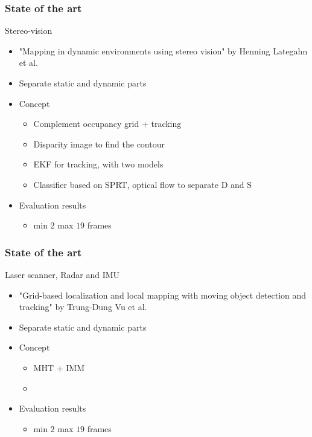 \documentclass{beamer}
\begin{document}
	\begin{frame}
		\frametitle{State of the art}	
		\begin{block}{Stereo-vision}
			\begin{itemize}
			\item "Mapping in dynamic environments using stereo vision" by Henning Lategahn et al.
			\item Separate static and dynamic parts
			\item Concept
				\begin{itemize}			
				\item Complement occupancy grid + tracking
				\item Disparity image to find the contour
				\item EKF for tracking, with two models
				\item Classifier based on SPRT, optical flow to separate D and S				
				\end{itemize}		
			\item Evaluation results
				\begin{itemize}			
				\item min $2$ max $19$ frames
				\end{itemize}							
			\end{itemize}				
		\end{block}
	\end{frame}

	\begin{frame}
		\frametitle{State of the art}	
		\begin{block}{Laser scanner, Radar and IMU}
			\begin{itemize}
			\item "Grid-based localization and local mapping with moving object detection and tracking" by Trung-Dung Vu et al.
			\item Separate static and dynamic parts
			\item Concept
				\begin{itemize}			
				\item MHT + IMM
				\item 
				\end{itemize}		
			\item Evaluation results
				\begin{itemize}			
				\item min $2$ max $19$ frames
				\end{itemize}				
			\end{itemize}				
		\end{block}
	\end{frame}
\end{document}
